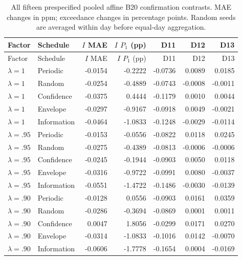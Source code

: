 \small\setlength{\tabcolsep}{4pt}
\begin{longtable}{llrrrrr}
\caption{All fifteen prespecified pooled affine B20 confirmation contrasts. MAE changes in ppm; exceedance changes in percentage points. Random seeds are averaged within day before equal-day aggregation.}\label{tab:sc5b20}\\
\toprule
Factor & Schedule & $I$ MAE & $I$ $P_1$ (pp) & D11 & D12 & D13 \\ \midrule\endfirsthead
\toprule
Factor & Schedule & $I$ MAE & $I$ $P_1$ (pp) & D11 & D12 & D13 \\ \midrule\endhead
\bottomrule\endfoot
$\lambda=1$ & Periodic & -0.0154 & -0.2222 & -0.0736 & 0.0089 & 0.0185 \\
$\lambda=1$ & Random & -0.0254 & -0.4889 & -0.0743 & -0.0008 & -0.0011 \\
$\lambda=1$ & Confidence & -0.0375 & 0.4444 & -0.1179 & 0.0010 & 0.0044 \\
$\lambda=1$ & Envelope & -0.0297 & -0.9167 & -0.0918 & 0.0049 & -0.0021 \\
$\lambda=1$ & Information & -0.0464 & -1.0833 & -0.1248 & -0.0029 & -0.0114 \\
$\lambda=.95$ & Periodic & -0.0153 & -0.0556 & -0.0822 & 0.0118 & 0.0245 \\
$\lambda=.95$ & Random & -0.0275 & -0.4389 & -0.0813 & -0.0006 & -0.0006 \\
$\lambda=.95$ & Confidence & -0.0245 & -0.1944 & -0.0903 & 0.0050 & 0.0118 \\
$\lambda=.95$ & Envelope & -0.0316 & -0.9722 & -0.0991 & 0.0080 & -0.0037 \\
$\lambda=.95$ & Information & -0.0551 & -1.4722 & -0.1486 & -0.0030 & -0.0139 \\
$\lambda=.90$ & Periodic & -0.0128 & 0.0556 & -0.0903 & 0.0161 & 0.0359 \\
$\lambda=.90$ & Random & -0.0286 & -0.3694 & -0.0869 & 0.0001 & 0.0011 \\
$\lambda=.90$ & Confidence & 0.0047 & 1.8056 & -0.0299 & 0.0171 & 0.0270 \\
$\lambda=.90$ & Envelope & -0.0314 & -1.0833 & -0.1016 & 0.0142 & -0.0070 \\
$\lambda=.90$ & Information & -0.0606 & -1.7778 & -0.1654 & 0.0004 & -0.0169 \\
\end{longtable}\normalsize
